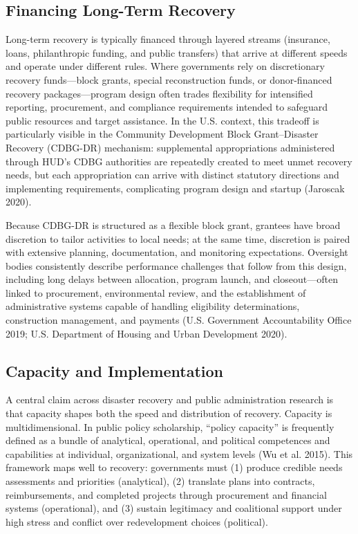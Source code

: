 \documentclass[
  12pt,
  letterpaper,
]{article}
\begin{document}
\subsection{Financing Long-Term
Recovery}\label{financing-long-term-recovery}

Long-term recovery is typically financed through layered streams
(insurance, loans, philanthropic funding, and public transfers) that
arrive at different speeds and operate under different rules. Where
governments rely on discretionary recovery funds---block grants, special
reconstruction funds, or donor-financed recovery packages---program
design often trades flexibility for intensified reporting, procurement,
and compliance requirements intended to safeguard public resources and
target assistance. In the U.S. context, this tradeoff is particularly
visible in the Community Development Block Grant--Disaster Recovery
(CDBG-DR) mechanism: supplemental appropriations administered through
HUD's CDBG authorities are repeatedly created to meet unmet recovery
needs, but each appropriation can arrive with distinct statutory
directions and implementing requirements, complicating program design
and startup (Jaroscak 2020).

Because CDBG-DR is structured as a flexible block grant, grantees have
broad discretion to tailor activities to local needs; at the same time,
discretion is paired with extensive planning, documentation, and
monitoring expectations. Oversight bodies consistently describe
performance challenges that follow from this design, including long
delays between allocation, program launch, and closeout---often linked
to procurement, environmental review, and the establishment of
administrative systems capable of handling eligibility determinations,
construction management, and payments (U.S. Government Accountability
Office 2019; U.S. Department of Housing and Urban Development 2020).

\subsection{Capacity and
Implementation}\label{capacity-and-implementation}

A central claim across disaster recovery and public administration
research is that capacity shapes both the speed and distribution of
recovery. Capacity is multidimensional. In public policy scholarship,
``policy capacity'' is frequently defined as a bundle of analytical,
operational, and political competences and capabilities at individual,
organizational, and system levels (Wu et al. 2015). This framework maps
well to recovery: governments must (1) produce credible needs
assessments and priorities (analytical), (2) translate plans into
contracts, reimbursements, and completed projects through procurement
and financial systems (operational), and (3) sustain legitimacy and
coalitional support under high stress and conflict over redevelopment
choices (political).
\end{document}
